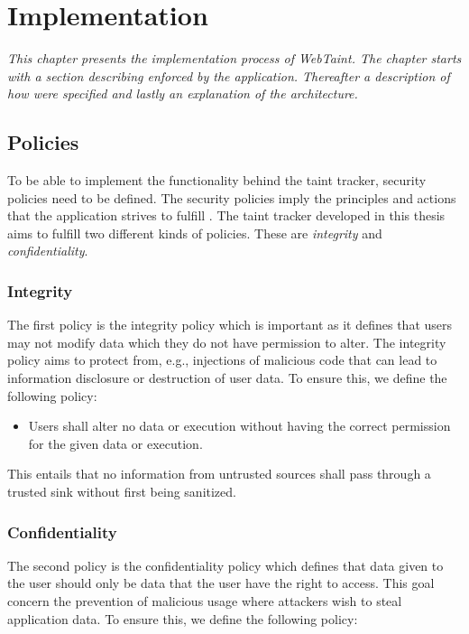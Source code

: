 \chapter{Implementation}
\label{Implementation}
\textit{This chapter presents the implementation process of WebTaint. The chapter starts with a section describing \textit{} enforced by the application. Thereafter a description of how  \textit{} were specified and lastly an explanation of the  \textit{} architecture.}



\section{Policies}
\label{Policies}
To be able to implement the functionality behind the taint tracker, security policies need to be defined. The security policies imply the principles and actions that the application strives to fulfill \parencite{BayukJenniferL2012Cspg}. The taint tracker developed in this thesis aims to fulfill two different kinds of policies. These are \textit{integrity} and \textit{confidentiality}.



\subsection{Integrity}
\label{Integrity}
The first policy is the integrity policy which is important as it defines that users may not modify data which they do not have permission to alter. The integrity policy aims to protect from, e.g., injections of malicious code that can lead to information disclosure or destruction of user data. To ensure this, we define the following policy:

\hfill
\begin{itemize}
    \item Users shall alter no data or execution without having the correct permission for the given data or execution.
\end{itemize}
\hfill

This entails that no information from untrusted sources shall pass through a trusted sink without first being sanitized.



\subsection{Confidentiality}
\label{Confidentiality}
The second policy is the confidentiality policy which defines that data given to the user should only be data that the user have the right to access. This goal concern the prevention of malicious usage where attackers wish to steal application data. To ensure this, we define the following policy:

